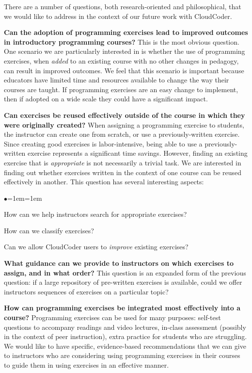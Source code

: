 \documentclass{sig-alternate}
\newenvironment{denseItemize}{%
\begin{list}{$\bullet$}{\setlength{\itemsep}{0in}\setlength{\parsep}{0in}\leftmargin=1em\labelwidth=1em}}{\end{list}}
\begin{document}
There are a number of questions, both research-oriented and philosophical,
that we would like to address in the context of our future work with CloudCoder.

{\bf Can the adoption of programming exercises lead to improved outcomes
in introductory programming courses?}  This is the most obvious
question.  One scenario we are particularly interested in is whether
the use of programming exercises, when {\em added} to an existing course with
no other changes in pedagogy, can result in improved outcomes.  We feel
that this scenario is important because educators have limited time
and resources available to change the way their courses are taught.
If programming exercises are an easy change to implement, then
if adopted on a wide scale they could have a significant impact.

{\bf Can exercises be reused effectively outside of the course in which
they were originally created?}  When assigning a programming exercise to
students, the instructor can create one from scratch, or use a
previously-written exercise.  Since creating good exercises is labor-intensive,
being able to use a previously-written exercise represents a significant
time savings.  However, finding an existing exercise that is {\em appropriate}
is not necessarily a trivial task.  We are interested in finding
out whether exercises written in the context of one course can be reused
effectively in another.
This question has several interesting aspects:

\begin{denseItemize}
\item How can we help instructors search for appropriate exercises?
\item How can we classify exercises?
\item Can we allow CloudCoder users to {\em improve} existing exercises?
\end{denseItemize}

{\bf What guidance can we provide to instructors on which exercises to assign,
and in what order?}  This question is an expanded form of the previous question:
if a large repository of pre-written exercises is available,
could we offer instructors sequences of exercises on a particular topic?

{\bf How can programming exercises be integrated most effectively into a course?}
Programming exercises can be used for many purposes: self-test questions
to accompany readings and video lectures, in-class assessment (possibly
in the context of peer instruction), extra practice for students who
are struggling.  We would like to have specific, evidence-based recommendations
that we can give to instructors who are considering using programming
exercises in their courses to guide them in using exercises in an effective manner.
\end{document}
